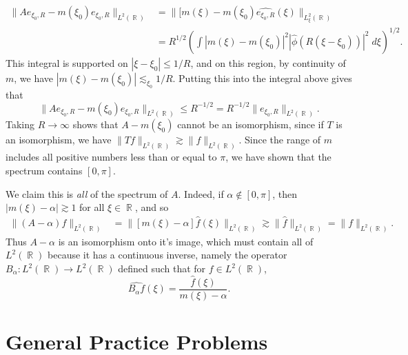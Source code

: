 \documentclass[answers]{exam}
\DeclareMathOperator{\RR}{\mathbb{R}}
\begin{document}
\begin{questions}
\begin{solution}
	\begin{align*}
		\| Ae_{\xi_0,R} - m(\xi_0) e_{\xi_0,R} \|_{L^2(\RR)} &= \| [m(\xi) - m(\xi_0) \widehat{e_{\xi_0,R}}(\xi) \|_{L^2_\xi(\RR)}\\
		&= R^{1/2} \left( \int |m(\xi) - m(\xi_0)|^2 |\widehat{\phi}(R (\xi - \xi_0))|^2\; d\xi \right)^{1/2}.
	\end{align*}
	This integral is supported on $|\xi - \xi_0| \leq 1/R$, and on this region, by continuity of $m$, we have $|m(\xi) - m(\xi_0)| \lesssim_{\xi_0} 1/R$. Putting this into the integral above gives that
	\[ \| Ae_{\xi_0,R} - m(\xi_0) e_{\xi_0,R} \|_{L^2(\RR)} \leq R^{-1/2} = R^{-1/2} \| e_{\xi_0,R} \|_{L^2(\RR)}. \]
	Taking $R \to \infty$ shows that $A - m(\xi_0)$ cannot be an isomorphism, since if $T$ is an isomorphism, we have $\| Tf \|_{L^2(\RR)} \gtrsim \| f \|_{L^2(\RR)}$. Since the range of $m$ includes all positive numbers less than or equal to $\pi$, we have shown that the spectrum contains $[0,\pi]$.

	We claim this is \emph{all} of the spectrum of $A$. Indeed, if $\alpha \not \in [0,\pi]$, then $|m(\xi) - \alpha| \gtrsim 1$ for all $\xi \in \RR$, and so
	\begin{align*}
		\| (A - \alpha) f \|_{L^2(\RR)} &= \| [m(\xi) - \alpha] \widehat{f}(\xi) \|_{L^2(\RR)} \gtrsim \| \widehat{f} \|_{L^2(\RR)} = \| f \|_{L^2(\RR)}.
	\end{align*}
	Thus $A - \alpha$ is an isomorphism onto it's image, which must contain all of $L^2(\RR)$ because it has a continuous inverse, namely the operator $B_\alpha: L^2(\RR) \to L^2(\RR)$ defined such that for $f \in L^2(\RR)$,
	\[ \widehat{B_\alpha f}(\xi) = \frac{\widehat{f}(\xi)}{m(\xi) - \alpha}. \]
\end{solution}

\newpage
\section{General Practice Problems}


\end{questions}
\end{document}
